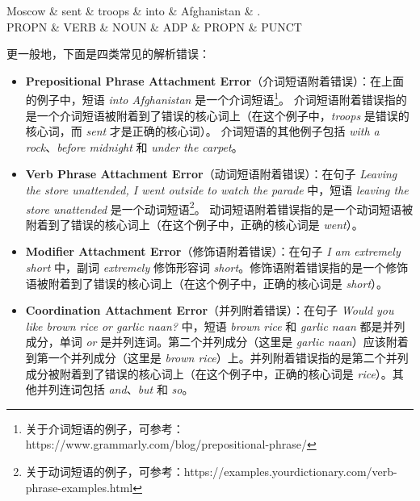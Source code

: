 \begin{parts}
\begin{center}
 {
 \begin{dependency}
 \begin{deptext}
Moscow  \& sent \& troops \& into  \& Afghanistan \& .     \\
 PROPN \& VERB  \& NOUN  \& ADP \& PROPN \& PUNCT \\
 \end{deptext}
 \end{dependency}
 }
 \end{center}

更一般地，下面是四类常见的解析错误：
\begin{itemize}
    \item \textbf{Prepositional Phrase Attachment Error}（介词短语附着错误）：在上面的例子中，短语 \textit{into Afghanistan} 是一个介词短语\footnote{关于介词短语的例子，可参考：https://www.grammarly.com/blog/prepositional-phrase/}。
    介词短语附着错误指的是一个介词短语被附着到了错误的核心词上（在这个例子中，\textit{troops} 是错误的核心词，而 \textit{sent} 才是正确的核心词）。
    介词短语的其他例子包括 \textit{with a rock}、\textit{before midnight} 和 \textit{under the carpet}。
    \item \textbf{Verb Phrase Attachment Error}（动词短语附着错误）：在句子 \textit{Leaving the store unattended, I went outside to watch the parade} 中，短语 \textit{leaving the store unattended} 是一个动词短语\footnote{关于动词短语的例子，可参考：https://examples.yourdictionary.com/verb-phrase-examples.html}。
    动词短语附着错误指的是一个动词短语被附着到了错误的核心词上（在这个例子中，正确的核心词是 \textit{went}）。
    \item \textbf{Modifier Attachment Error}（修饰语附着错误）：在句子 \textit{I am extremely short} 中，副词 \textit{extremely} 修饰形容词 \textit{short}。修饰语附着错误指的是一个修饰语被附着到了错误的核心词上（在这个例子中，正确的核心词是 \textit{short}）。
    \item \textbf{Coordination Attachment Error}（并列附着错误）：在句子 \textit{Would you like brown rice or garlic naan?} 中，短语 \textit{brown rice} 和 \textit{garlic naan} 都是并列成分，单词 \textit{or} 是并列连词。第二个并列成分（这里是 \textit{garlic naan}）应该附着到第一个并列成分（这里是 \textit{brown rice}）上。并列附着错误指的是第二个并列成分被附着到了错误的核心词上（在这个例子中，正确的核心词是 \textit{rice}）。其他并列连词包括 \textit{and}、\textit{but} 和 \textit{so}。

\end{itemize}
\end{parts}
